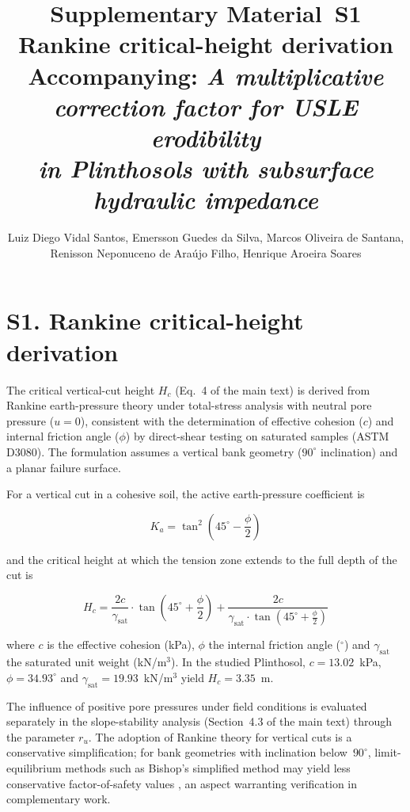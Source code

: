 \documentclass[12pt,a4paper]{article}
\title{\textbf{Supplementary Material~S1}\\[6pt]
Rankine critical-height derivation\\[6pt]
\large Accompanying: \textit{A multiplicative correction factor for USLE erodibility\\in Plinthosols with subsurface hydraulic impedance}}
\author{Luiz Diego Vidal Santos, Emersson Guedes da Silva, Marcos Oliveira de Santana,\\
Renisson Neponuceno de Ara\'{u}jo Filho, Henrique Aroeira Soares}
\date{}
\begin{document}
\maketitle

\section*{S1. Rankine critical-height derivation}

The critical vertical-cut height $H_c$ (Eq.~4 of the main text) is derived from Rankine earth-pressure theory under total-stress analysis with neutral pore pressure ($u = 0$), consistent with the determination of effective cohesion ($c$) and internal friction angle ($\phi$) by direct-shear testing on saturated samples (ASTM D3080). The formulation assumes a vertical bank geometry ($90^\circ$ inclination) and a planar failure surface.

For a vertical cut in a cohesive soil, the active earth-pressure coefficient is

\begin{equation}
K_a = \tan^2\!\left(45^\circ - \frac{\phi}{2}\right)
\end{equation}

\noindent and the critical height at which the tension zone extends to the full depth of the cut is

\begin{equation}
H_c = \frac{2c}{\gamma_{\mathrm{sat}}} \cdot \tan\!\left(45^\circ + \frac{\phi}{2}\right) + \frac{2c}{\gamma_{\mathrm{sat}} \cdot \tan\!\left(45^\circ + \frac{\phi}{2}\right)}
\end{equation}

\noindent where $c$ is the effective cohesion (kPa), $\phi$ the internal friction angle ($^\circ$) and $\gamma_{\mathrm{sat}}$ the saturated unit weight (kN/m$^3$). In the studied Plinthosol, $c = 13.02$~kPa, $\phi = 34.93^\circ$ and $\gamma_{\mathrm{sat}} = 19.93$~kN/m$^3$ yield $H_c = 3.35$~m.

The influence of positive pore pressures under field conditions is evaluated separately in the slope-stability analysis (Section~4.3 of the main text) through the parameter $r_u$. The adoption of Rankine theory for vertical cuts is a conservative simplification; for bank geometries with inclination below~$90^\circ$, limit-equilibrium methods such as Bishop's simplified method may yield less conservative factor-of-safety values \citep{fredlund_rahardjo_1993}, an aspect warranting verification in complementary work.



\end{document}
